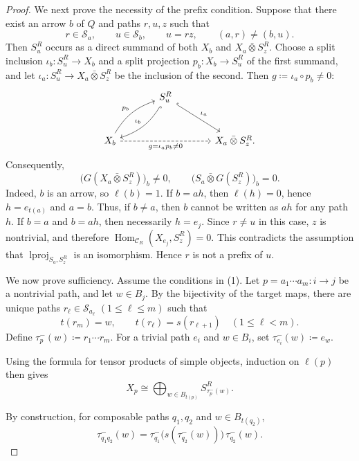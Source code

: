 \documentclass{amsart}
\DeclareMathOperator{\lproj}{lproj}
\newcommand{\btensor}{\mathbin{\bar{\otimes}}}
\theoremstyle{definition}
\theoremstyle{remark}
\numberwithin{equation}{section}
\begin{document}
\begin{proof}
We next prove the necessity of the prefix condition.
Suppose that there exist an arrow $b$ of $Q$ and paths $r,u,z$ such that
\[
r\in\mathcal S_a,
\qquad
u\in\mathcal S_b,
\qquad
u=rz,
\qquad
(a,r)\neq(b,u).
\]
Then $S_u^R$ occurs as a direct summand of both
$X_b$ and $X_a\btensor S_z^R$. Choose a split inclusion
$\iota_b\colon S_u^R\to X_b$ and a split projection
$p_b\colon X_b\to S_u^R$ of the first summand, and let
$\iota_a\colon S_u^R\to X_a\btensor S_z^R$ be the inclusion of the second.
Then $g\coloneqq\iota_a\circ p_b\neq0$:
\[
\begin{tikzcd}[column sep=large,row sep=large]
&
S_u^R
  \arrow[dl,hook,bend left=20,"\iota_b"']
  \arrow[dr,hook,"\iota_a"]
&\\
X_b
  \arrow[ur,bend left=20,"p_b"]
  \arrow[rr,dashed,"g=\iota_a p_b\neq0"']
& &
X_a\btensor S_z^R.
\end{tikzcd}
\]
Consequently,
\[
\bigl(G(X_a\btensor S_z^R)\bigr)_b\neq0,
\qquad
\bigl(S_a\btensor G(S_z^R)\bigr)_b=0.
\]
Indeed, $b$ is an arrow, so $\ell(b)=1$. If $b=ah$, then $\ell(h)=0$,
hence $h=e_{t(a)}$ and $a=b$.
Thus, if $b\neq a$, then $b$ cannot be written as $ah$ for any path $h$.
If $b=a$ and $b=ah$, then necessarily $h=e_j$.
Since $r\neq u$ in this case, $z$ is nontrivial, and therefore
$\operatorname{Hom}_{\mathcal C_R}(X_{e_j},S_z^R)=0$.
This contradicts the assumption that
$\lproj_{S_a,S_z^R}$
is an isomorphism.
Hence $r$ is not a prefix of $u$.

We now prove sufficiency.
Assume the conditions in \textup{(1)}.
Let $p=a_1\cdots a_m\colon i\to j$ be a nontrivial path, and let $w\in B_j$.
By the bijectivity of the target maps, there are unique paths
$r_\ell\in\mathcal S_{a_\ell}$ $(1\leq\ell\leq m)$ such that
\[
t(r_m)=w,
\qquad
t(r_\ell)=s(r_{\ell+1})
\quad (1\leq\ell<m).
\]
Define $\tau_p^{-}(w)\coloneqq r_1\cdots r_m$.
For a trivial path $e_i$ and $w\in B_i$, set
$\tau_{e_i}^{-}(w)\coloneqq e_w$.

Using the formula for tensor products of simple objects, induction on
$\ell(p)$ then gives
\begin{equation}\label{xxeq5-5}
X_p
\cong
\bigoplus_{w\in B_{t(p)}}
S_{\tau_p^{-}(w)}^R.
\end{equation}

By construction, for composable paths $q_1,q_2$ and
$w\in B_{t(q_2)}$,
\begin{equation}\label{xxeq5-6}
\tau_{q_1q_2}^-(w)
=
\tau_{q_1}^-\bigl(s(\tau_{q_2}^-(w))\bigr)\,
\tau_{q_2}^-(w).
\end{equation}


\end{proof}
\end{document}
